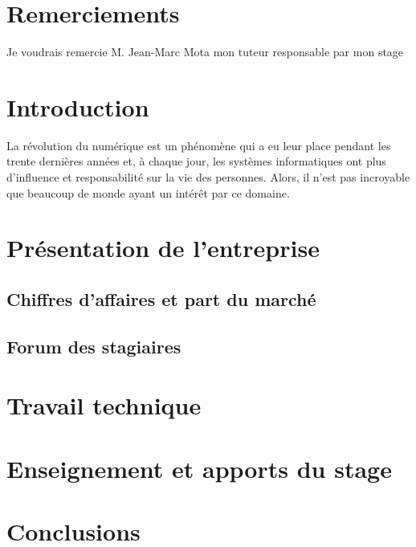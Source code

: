 \documentclass[a4paper, 12pt]{article} %
\begin{document}
\newpage
\section{Remerciements}
Je voudrais remercie M. Jean-Marc Mota mon tuteur responsable par mon stage

\newpage
\tableofcontents

\newpage
\section{Introduction}
La révolution du numérique est un phénomène qui a eu leur place pendant les trente dernières années et, à chaque jour, les systèmes informatiques ont plus d'influence et responsabilité sur la vie des personnes. Alors, il n'est pas incroyable que beaucoup de monde ayant un intérêt par ce domaine.  

\newpage
\section{Présentation de l'entreprise}
\subsection{Chiffres d'affaires et part du marché}
\subsection{Forum des stagiaires}

\newpage
\section{Travail technique}

\newpage
\section{Enseignement et apports du stage}


\newpage
\section{Conclusions}
\end{document}
